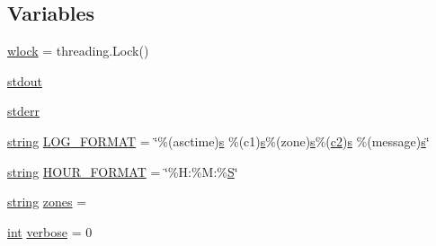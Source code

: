\subsection*{Variables}
\begin{DoxyCompactItemize}
\item 
\hyperlink{namespacewaflib_1_1_logs_a30dce00452028144a8eb46b24509aedb}{wlock} = threading.\+Lock()
\item 
\hyperlink{namespacewaflib_1_1_logs_af29121f123b22497c143dda1d85c07f1}{stdout}
\item 
\hyperlink{namespacewaflib_1_1_logs_ac627e89af00505ebc02bd5fc6242c9ad}{stderr}
\item 
\hyperlink{test__lib_f_l_a_c_2format_8c_ab02026ad0de9fb6c1b4233deb0a00c75}{string} \hyperlink{namespacewaflib_1_1_logs_a58481ae94e5c27a87d83c8bd691f9263}{L\+O\+G\+\_\+\+F\+O\+R\+M\+AT} = \char`\"{}\%(asctime)\hyperlink{lib_2expat_8h_a755339d27872b13735c2cab829e47157}{s} \%(c1)\hyperlink{lib_2expat_8h_a755339d27872b13735c2cab829e47157}{s}\%(zone)\hyperlink{lib_2expat_8h_a755339d27872b13735c2cab829e47157}{s}\%(\hyperlink{convtest_8m_a09ab2f3b6c61c793c7b6d24912b2cea0}{c2})\hyperlink{lib_2expat_8h_a755339d27872b13735c2cab829e47157}{s} \%(message)\hyperlink{lib_2expat_8h_a755339d27872b13735c2cab829e47157}{s}\char`\"{}
\item 
\hyperlink{test__lib_f_l_a_c_2format_8c_ab02026ad0de9fb6c1b4233deb0a00c75}{string} \hyperlink{namespacewaflib_1_1_logs_a056fc4f4d0312c670d1a48a6e7437e4f}{H\+O\+U\+R\+\_\+\+F\+O\+R\+M\+AT} = \char`\"{}\%H\+:\%M\+:\%\hyperlink{xlftab_8c_af933676109efed7ab34cea71d748a517}{S}\char`\"{}
\item 
\hyperlink{test__lib_f_l_a_c_2format_8c_ab02026ad0de9fb6c1b4233deb0a00c75}{string} \hyperlink{namespacewaflib_1_1_logs_aba9794a0b8c3714be5f6b71f6a9c5192}{zones} = \textquotesingle{}\textquotesingle{}
\item 
\hyperlink{xmltok_8h_a5a0d4a5641ce434f1d23533f2b2e6653}{int} \hyperlink{namespacewaflib_1_1_logs_ad9dd20b34692d71ff82d165737aa0505}{verbose} = 0
\item 

\end{DoxyCompactItemize}
